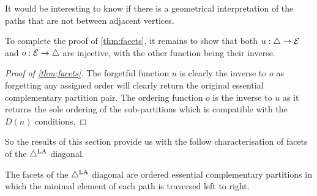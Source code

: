 \begin{remark}
    It would be interesting to know if there is a geometrical interpretation of the paths that are not between adjacent vertices. 
    
\end{remark}

To complete the proof of \cref{thm:facets}, it remains to show that both $u:\triangle \to \mathcal{E}$ and $o:\mathcal{E}\to \triangle$ are injective, with the other function being their inverse.

\begin{proof}[{Proof of \cref{thm:facets}}]
The forgetful function $u$ is clearly the inverse to $o$ as forgetting any assigned order will clearly return the original essential complementary partition pair. 
The ordering function $o$ is the inverse to $u$ as it returns the sole ordering of the sub-partitions which is compatible with the $D(n)$ conditions.
\end{proof}

So the results of this section provide us with the follow characterisation of facets of the $\triangle^{\mathrm{LA}}$ diagonal.
\begin{proposition} \label{prop:LAD are ordered EC}
The facets of the $\triangle^{\mathrm{LA}}$ diagonal are ordered essential complementary partitions in which the minimal element of each path is traversed left to right.
\end{proposition}

